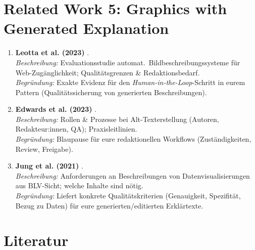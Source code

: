 \section{Related Work 5: Graphics with Generated Explanation}
\begin{enumerate}
  \item \textbf{Leotta et al. (2023)} \cite{Leotta2023AutoCaptioning}.\\
  \emph{Beschreibung:} Evaluationsstudie automat.\ Bildbeschreibungssysteme für Web-Zugänglichkeit; Qualitätsgrenzen \& Redaktionsbedarf.\\
  \emph{Begründung:} Exakte Evidenz für den \emph{Human-in-the-Loop}-Schritt in eurem Pattern (Qualitätssicherung von generierten Beschreibungen).
  
  \item \textbf{Edwards et al. (2023)} \cite{Edwards2023AltTextProcess}.\\
  \emph{Beschreibung:} Rollen \& Prozesse bei Alt-Texterstellung (Autoren, Redakteur:innen, QA); Praxisleitlinien.\\
  \emph{Begründung:} Blaupause für eure redaktionellen Workflows (Zuständigkeiten, Review, Freigabe).
  
  \item \textbf{Jung et al. (2021)} \cite{Jung2021AltText}.\\
  \emph{Beschreibung:} Anforderungen an Beschreibungen von Datenvisualisierungen aus BLV-Sicht; welche Inhalte sind nötig.\\
  \emph{Begründung:} Liefert konkrete Qualitätskriterien (Genauigkeit, Spezifität, Bezug zu Daten) für eure generierten/editierten Erklärtexte.
\end{enumerate}

\section*{Literatur}




